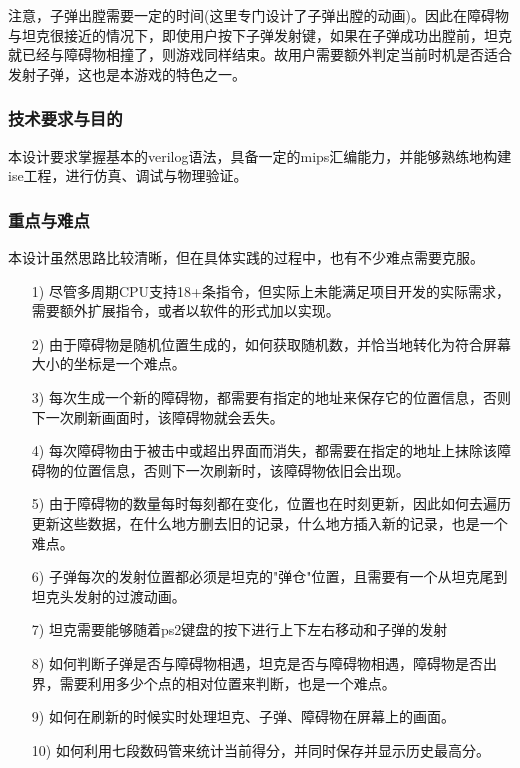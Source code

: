 注意，子弹出膛需要一定的时间(这里专门设计了子弹出膛的动画)。因此在障碍物与坦克很接近的情况下，即使用户按下子弹发射键，如果在子弹成功出膛前，坦克就已经与障碍物相撞了，则游戏同样结束。故用户需要额外判定当前时机是否适合发射子弹，这也是本游戏的特色之一。\\

\subsubsection{技术要求与目的}

本设计要求掌握基本的verilog语法，具备一定的mips汇编能力，并能够熟练地构建ise工程，进行仿真、调试与物理验证。

\subsubsection{重点与难点}

本设计虽然思路比较清晰，但在具体实践的过程中，也有不少难点需要克服。

\begin{itemize}
    \item [1)] 尽管多周期CPU支持18+条指令，但实际上未能满足项目开发的实际需求，需要额外扩展指令，或者以软件的形式加以实现。
    \item[2)] 由于障碍物是随机位置生成的，如何获取随机数，并恰当地转化为符合屏幕大小的坐标是一个难点。
    \item[3)] 每次生成一个新的障碍物，都需要有指定的地址来保存它的位置信息，否则下一次刷新画面时，该障碍物就会丢失。  
    \item[4)] 每次障碍物由于被击中或超出界面而消失，都需要在指定的地址上抹除该障碍物的位置信息，否则下一次刷新时，该障碍物依旧会出现。
    \item[5)] 由于障碍物的数量每时每刻都在变化，位置也在时刻更新，因此如何去遍历更新这些数据，在什么地方删去旧的记录，什么地方插入新的记录，也是一个难点。
    \item[6)] 子弹每次的发射位置都必须是坦克的"弹仓"位置，且需要有一个从坦克尾到坦克头发射的过渡动画。
    \item[7)] 坦克需要能够随着ps2键盘的按下进行上下左右移动和子弹的发射
    \item[8)] 如何判断子弹是否与障碍物相遇，坦克是否与障碍物相遇，障碍物是否出界，需要利用多少个点的相对位置来判断，也是一个难点。
    \item[9)] 如何在刷新的时候实时处理坦克、子弹、障碍物在屏幕上的画面。
    \item[10)] 如何利用七段数码管来统计当前得分，并同时保存并显示历史最高分。
\end{itemize}



